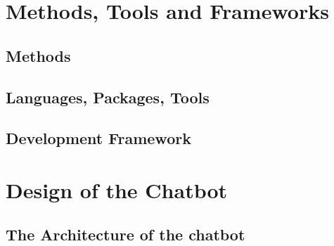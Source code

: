 \documentclass[11pt]{article}
\begin{document}
\section{Methods, Tools and Frameworks}

\subsection{Methods}

   



             
\subsection{Languages, Packages, Tools}




 
\subsection{Development Framework}


\section{Design of the Chatbot}

 
\subsection{The Architecture of the chatbot}
\end{document}
